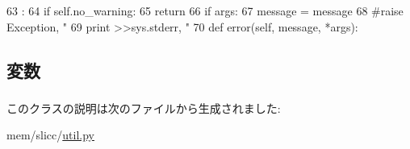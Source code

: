 \begin{DoxyCode}
63                                      :
64         if self.no_warning:
65             return
66         if args:
67             message = message %
68         #raise Exception, "%
69         print >>sys.stderr, "%
70 
    def error(self, message, *args):
\end{DoxyCode}


\subsection{変数}
\hypertarget{classslicc_1_1util_1_1Location_a2ff994e16bf9521154de4cf659a3b689}{
\subsubsection[{filename}]{}}
\label{classslicc_1_1util_1_1Location_a2ff994e16bf9521154de4cf659a3b689}
\hypertarget{classslicc_1_1util_1_1Location_a20bfe3cddeded33e0531d53de5bdaef5}{
\subsubsection[{lineno}]{}}
\label{classslicc_1_1util_1_1Location_a20bfe3cddeded33e0531d53de5bdaef5}
\hypertarget{classslicc_1_1util_1_1Location_a38c7630257a6dd9fb890c668ff728264}{
\subsubsection[{no\_\-warning}]{}}
\label{classslicc_1_1util_1_1Location_a38c7630257a6dd9fb890c668ff728264}


このクラスの説明は次のファイルから生成されました:\begin{DoxyCompactItemize}
\item 
mem/slicc/\hyperlink{util_8py}{util.py}\end{DoxyCompactItemize}
